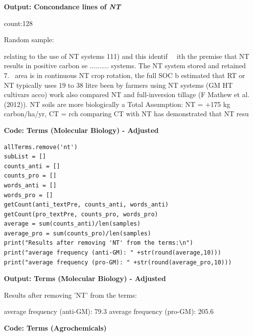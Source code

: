 \textbf{Output: Concondance lines of \textit{NT}}

\begin{footnotesize}
count:128

Random sample:

relating to the use of NT systems 111) and this identif\newline
\ \ ith the premise that NT results in positive carbon se\newline
.......... systems. The NT system stored and retained 7.\newline
\ area is in continuous NT crop rotation, the full SOC b\newline
estimated that RT or NT typically uses 19 to 38 litre\newline
been by farmers using NT systems (GM HT cultivars acco) work also compared NT and full-inversion tillage (F\newline
Mathew et al. (2012)). NT soils are more biologically a Total Assumption: NT = +175 kg carbon/ha/yr, CT = \newline
rch comparing CT with NT has demonstrated that NT resu\newline
\end{footnotesize}

\textbf{Code: Terms (Molecular Biology) - Adjusted}

\begin{lstlisting}
allTerms.remove('nt')
subList = []
counts_anti = []
counts_pro = []
words_anti = []
words_pro = []
getCount(anti_textPre, counts_anti, words_anti)    
getCount(pro_textPre, counts_pro, words_pro)
average = sum(counts_anti)/len(samples)
average_pro = sum(counts_pro)/len(samples)
print("Results after removing 'NT' from the terms:\n")   
print("average frequency (anti-GM): " +str(round(average,10)))
print("average frequency (pro-GM): " +str(round(average_pro,10)))
\end{lstlisting}

\textbf{Output: Terms (Molecular Biology) - Adjusted}

\begin{footnotesize}
Results after removing 'NT' from the terms:

average frequency (anti-GM): 79.3\newline
average frequency (pro-GM): 205.6
\end{footnotesize}

\textbf{Code: Terms (Agrochemicals)}

